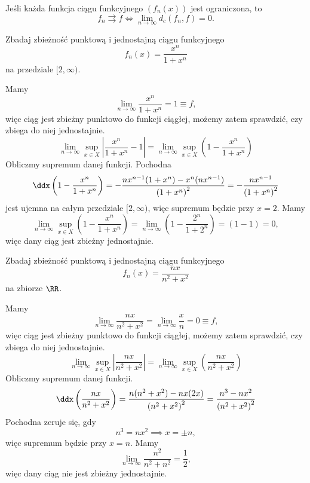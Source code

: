 \begin{theorem}
    \label{t:uniform convergence iff metric = 0}
    Jeśli każda funkcja ciągu funkcyjnego $(f_n(x))$ jest ograniczona, to
    \[ f_n \rightrightarrows f \Longleftrightarrow \lim_{n\to\infty}d_c(f_n, f) = 0 .\]
\end{theorem}

\begin{example}
    Zbadaj zbieżność punktową i jednostajną ciągu funkcyjnego
    \[ f_n(x) = \frac{x^n}{1 + x^n} \]
    na przedziale $[2, \infty)$.
\end{example}
\begin{solution}
    Mamy
    \[ \lim_{n\to\infty} \frac{x^n}{1 + x^n} = 1 \equiv f, \]
    więc ciąg jest zbieżny punktowo do funkcji ciągłej, możemy zatem sprawdzić, czy zbiega do niej jednostajnie.
    \[ \lim_{n\to\infty}\sup_{x\in X} \left|\frac{x^n}{1 + x^n} - 1\right| = \lim_{n\to\infty}\sup_{x\in X} \left(1 - \frac{x^n}{1 + x^n}\right)\]
    Obliczmy supremum danej funkcji. Pochodna
    \[ \ddx \left(1 - \frac{x^n}{1 + x^n}\right) = -\frac{nx^{n-1}(1 + x^n) - x^n(nx^{n-1})}{\left(1 + x^n\right)^2} = -\frac{nx^{n-1}}{\left(1 + x^n\right)^2} \]
    jest ujemna na całym przedziale $[2, \infty)$, więc supremum będzie przy $x = 2$. Mamy
    \[ \lim_{n\to\infty}\sup_{x\in X} \left(1 - \frac{x^n}{1 + x^n}\right) = \lim_{n\to\infty}\left(1 - \frac{2^n}{1 + 2^n}\right) = \left(1 - 1\right) = 0, \]
    więc dany ciąg jest zbieżny jednostajnie.
\end{solution}

\begin{example}
    Zbadaj zbieżność punktową i jednostajną ciągu funkcyjnego
    \[ f_n(x) = \frac{nx}{n^2 + x^2} \]
    na zbiorze $\RR$.
\end{example}
\begin{solution}
    Mamy
    \[ \lim_{n\to\infty} \frac{nx}{n^2 + x^2} = \lim_{n\to\infty} \frac{x}{n} = 0 \equiv f, \]
    więc ciąg jest zbieżny punktowo do funkcji ciągłej, możemy zatem sprawdzić, czy zbiega do niej jednostajnie.
    \[ \lim_{n\to\infty}\sup_{x\in X} \left|\frac{nx}{n^2 + x^2}\right| = \lim_{n\to\infty}\sup_{x\in X} \left(\frac{nx}{n^2 + x^2}\right) \]
    Obliczmy supremum danej funkcji.
    \[ \ddx \left(\frac{nx}{n^2 + x^2}\right) = \frac{n(n^2 + x^2) - nx(2x)}{\left(n^2 + x^2\right)^2} = \frac{n^3 - nx^2}{\left(n^2 + x^2\right)^2} \]
    Pochodna zeruje się, gdy
    \[ n^3 = nx^2 \implies x = \pm n, \]
    więc supremum będzie przy $x = n$. Mamy
    \[ \lim_{n\to\infty}\frac{n^2}{n^2 + n^2} = \frac{1}{2}, \]
    więc dany ciąg nie jest zbieżny jednostajnie.
\end{solution}

